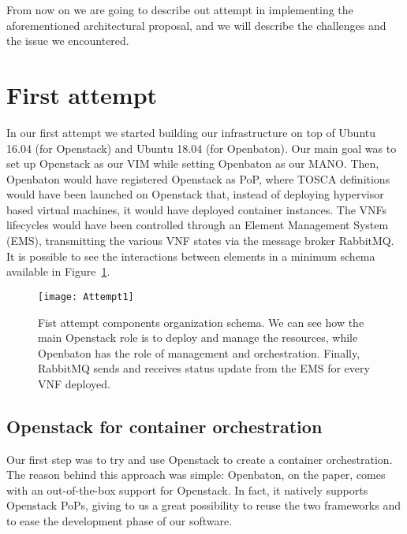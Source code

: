 From now on we are going to describe out attempt in implementing the
aforementioned architectural proposal, and we will describe the challenges and
the issue we encountered.

\section{First attempt}

In our first attempt we started building our infrastructure on top of Ubuntu
16.04 (for Openstack) and Ubuntu 18.04 (for Openbaton). Our main goal was to set
up Openstack as our VIM while setting Openbaton as our MANO. Then, Openbaton
would have registered Openstack as PoP, where TOSCA definitions would have been
launched on Openstack that, instead of deploying hypervisor based virtual
machines, it would have deployed container instances. The VNFs lifecycles would
have been controlled through an Element Management System (EMS), transmitting
the various VNF states via the message broker RabbitMQ. It is possible to see the
interactions between elements in a minimum schema available in
Figure~\ref{chap:archimpl:sec:fistattempt:img:schema1}.

\begin{figure}[t]
  \centering
  \texttt{[image: Attempt1]}
  \caption[Fist attempt components organization schema]{Fist attempt components
    organization schema. We can see how the main Openstack role is to deploy and
    manage the resources, while Openbaton has the role of management and
    orchestration. Finally, RabbitMQ sends and receives status update from the
    EMS for every VNF deployed.}
  \label{chap:archimpl:sec:fistattempt:img:schema1}
\end{figure}

\subsection{Openstack for container orchestration}

Our first step was to try and use Openstack to create a container orchestration.
The reason behind this approach was simple: Openbaton, on the paper, comes with
an out-of-the-box support for Openstack. In fact, it natively supports Openstack
PoPs, giving to us a great possibility to reuse the two frameworks and to ease
the development phase of our software.
